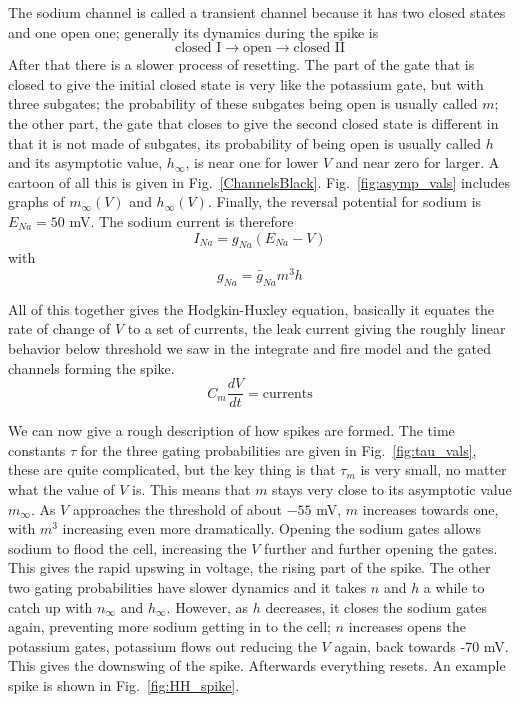 \documentclass[12pt]{article}
\begin{document}
The sodium channel is called a transient channel because it has two
closed states and one open one; generally its dynamics during the
spike is
\begin{equation}
\mbox{closed I}\rightarrow \mbox{open}\rightarrow\mbox{closed II}
\end{equation}
After that there is a slower process of resetting. The part of the
gate that is closed to give the initial closed state is very like the
potassium gate, but with three subgates; the probability of these
subgates being open is usually called $m$; the other part, the gate
that closes to give the second closed state is different in that it is
not made of subgates, its probability of being open is usually called
$h$ and its asymptotic value, $h_\infty$, is near one for lower $V$
and near zero for larger. A cartoon of all this is given in Fig.~\ref{ChannelsBlack}. Fig.~\ref{fig:asymp_vals} includes graphs of $m_\infty(V)$
and $h_\infty(V)$. Finally, the reversal potential for sodium is
$E_{Na}=50$ mV. The sodium current is therefore
\begin{equation}
I_{Na}=g_{Na}(E_{Na}-V)
\end{equation}
with
\begin{equation}
g_{Na}=\bar{g}_{Na}m^3h
\end{equation}


All of this together gives the Hodgkin-Huxley equation, basically it
equates the rate of change of $V$ to a set of currents, the leak
current giving the roughly linear behavior below threshold we saw in
the integrate and fire model and the gated channels forming the
spike.
\begin{equation}
C_m\frac{dV}{dt}=\mbox{currents}
\end{equation}

We can now give a rough description of how spikes are formed. The time
constants $\tau$ for the three gating probabilities are given in
Fig.~\ref{fig:tau_vals}, these are quite complicated, but the key
thing is that $\tau_m$ is very small, no matter what the value of $V$
is. This means that $m$ stays very close to its asymptotic value
$m_\infty$. As $V$ approaches the threshold of about $-55$ mV, $m$
increases towards one, with $m^3$ increasing even more
dramatically. Opening the sodium gates allows sodium to flood the
cell, increasing the $V$ further and further opening the gates. This
gives the rapid upswing in voltage, the rising part of the spike. The
other two gating probabilities have slower dynamics and it takes $n$
and $h$ a while to catch up with $n_\infty$ and $h_\infty$. However,
as $h$ decreases, it closes the sodium gates again, preventing more
sodium getting in to the cell; $n$ increases opens the potassium
gates, potassium flows out reducing the $V$ again, back towards -70
mV. This gives the downswing of the spike. Afterwards everything
resets. An example spike is shown in Fig.~\ref{fig:HH_spike}.
\end{document}
